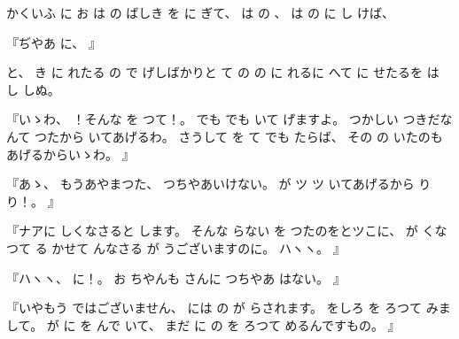 かくいふ
に
お
は
の
ばしき
を
に
ぎて、
%
は
の
、
%
は
の
に
し
けば、

『ぢやあ
に、
』

と、
%
き
に
れたる
の
で
げしばかりと
て
の
の%
に
れるに
へて
に
せたるを
は
し
しぬ。

『いゝわ、
%
！そんな
を
つて！。
%
でも
でも
いて
げますよ。
%
つかしい
つきだなんて
つたから
いてあげるわ。
%
さうして
を
て
でも
たらば、
%
その
の
いたのもあげるからいゝわ。
』

『あゝ、
%
もうあやまつた、
%
つちやあいけない。
%
が
ツ
ツ
いてあげるから
り
り！。
』

『ナアに
しくなさると
します。
%
そんな
らない
を
つたのをとツこに、
%
が
くなつて
る
かせて
んなさる
が
うございますのに。
%
ハヽヽ。
』

『ハヽヽ、
%
に！。%
%
お
ちやんも
さんに
つちやあ
はない。
』

『いやもう
ではございません、
%
には
の
が
らされます。
%
をしろ
を
ろつて
みまして。
%
が
に
を
んで
いて、
%
まだ
に
の
を
ろつて
めるんですもの。
』

